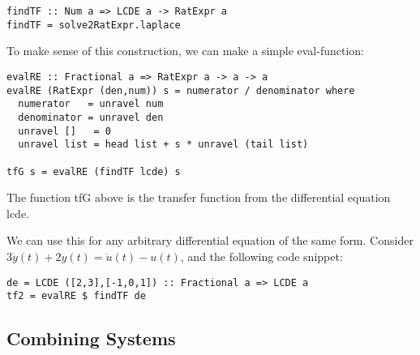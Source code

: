 \begin{verbatim}
findTF :: Num a => LCDE a -> RatExpr a
findTF = solve2RatExpr.laplace
\end{verbatim}

To make sense of this construction, we can make a simple eval-function:

\begin{verbatim}
evalRE :: Fractional a => RatExpr a -> a -> a
evalRE (RatExpr (den,num)) s = numerator / denominator where
  numerator   = unravel num
  denominator = unravel den
  unravel []   = 0
  unravel list = head list + s * unravel (tail list)

tfG s = evalRE (findTF lcde) s
\end{verbatim}

The function tfG above is the transfer function from the differential equation lcde.

We can use this for any arbitrary differential equation of the same form. Consider $3\dot{y}(t)+2y(t)=\ddot{u}(t)-u(t)$, and the following code snippet:

\begin{verbatim}
de = LCDE ([2,3],[-1,0,1]) :: Fractional a => LCDE a
tf2 = evalRE $ findTF de
\end{verbatim}

\subsection{Combining Systems}\label{sec:combsys}

